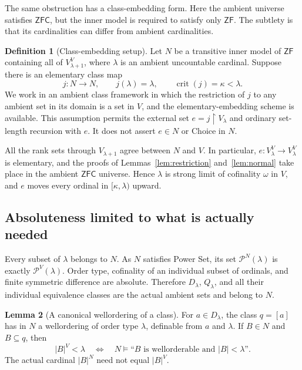 \documentclass[11pt,letterpaper]{article}
\theoremstyle{definition}
\newtheorem{definition}{Definition}[section]
\newtheorem{lemma}[definition]{Lemma}
\numberwithin{equation}{section}
\newcommand{\ZFC}{\mathsf{ZFC}}
\newcommand{\ZF}{\mathsf{ZF}}
\newcommand{\crit}{\operatorname{crit}}
\newcommand{\Pow}{\mathcal P}
\newcommand{\restr}{\mathbin{\upharpoonright}}
\begin{document}
The same obstruction has a class-embedding form. Here the ambient universe satisfies $\ZFC$, but the inner model is required to satisfy only $\ZF$. The subtlety is that its cardinalities can differ from ambient cardinalities.

\begin{definition}[Class-embedding setup]\label{def:class}
Let $N$ be a transitive inner model of $\ZF$ containing all of $V_{\lambda+1}^{V}$, where $\lambda$ is an ambient uncountable cardinal. Suppose there is an elementary class map
\[
 j:N\longrightarrow N,
 \qquad j(\lambda)=\lambda,
 \qquad\crit(j)=\kappa<\lambda.
\]
We work in an ambient class framework in which the restriction of $j$ to any ambient set in its domain is a set in $V$, and the elementary-embedding scheme is available. This assumption permits the external set $e=j\restr V_\lambda$ and ordinary set-length recursion with $e$. It does not assert $e\in N$ or Choice in $N$.
\end{definition}

All the rank sets through $V_{\lambda+1}$ agree between $N$ and $V$. In particular, $e:V_\lambda^V\to V_\lambda^V$ is elementary, and the proofs of Lemmas~\ref{lem:restriction} and~\ref{lem:normal} take place in the ambient $\ZFC$ universe. Hence $\lambda$ is strong limit of cofinality $\omega$ in $V$, and $e$ moves every ordinal in $[\kappa,\lambda)$ upward.

\subsection{Absoluteness limited to what is actually needed}

Every subset of $\lambda$ belongs to $N$. As $N$ satisfies Power Set, its set $\Pow^N(\lambda)$ is exactly $\Pow^V(\lambda)$. Order type, cofinality of an individual subset of ordinals, and finite symmetric difference are absolute. Therefore $D_\lambda$, $Q_\lambda$, and all their individual equivalence classes are the actual ambient sets and belong to $N$.

\begin{lemma}[A canonical wellordering of a class]\label{lem:wellorderclass}
For $a\in D_\lambda$, the class $q=[a]$ has in $N$ a wellordering of order type $\lambda$, definable from $a$ and $\lambda$. If $B\in N$ and $B\subseteq q$, then
\begin{equation}\label{eq:smallabsolute}
 |B|^V<\lambda
 \quad\Longleftrightarrow\quad
 N\models\text{``$B$ is wellorderable and $|B|<\lambda$''}.
\end{equation}
The actual cardinal $|B|^N$ need not equal $|B|^V$.
\end{lemma}
\end{document}
